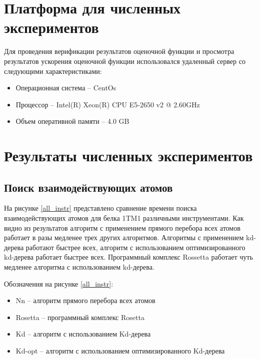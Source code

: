 \section{Платформа для численных экспериментов}


Для проведения верификации результатов оценочной функции и просмотра результатов ускорения оценочной функции использовался удаленный сервер со следующими характеристиками: 

\begin{itemize}
	\item Операционная система -- CentOs
	\item Процессор -- Intel(R) Xeon(R) CPU E5-2650 v2 @ 2.60GHz
	\item Объем оперативной памяти -- 4.0 GB
\end{itemize}


\section{Результаты численных экспериментов}

\subsection{Поиск взаимодействующих атомов}


На рисунке \ref{all_instr} представлено сравнение времени поиска взаимодействующих атомов для белка 1TM1 различными инструментами. Как видно из результатов алгоритм с применением прямого перебора всех атомов работает в разы медленее трех других алгоритмов. Алгоритмы с применением kd-дерева работают быстрее всех, алгоритм с использованием оптимизированного kd-дерева работает быстрее всех. Программный комплекс Rossetta работает чуть медленее алгоритма с использованием kd-дерева.

Обозначения на рисунке \ref{all_instr}:
\begin{itemize}
	\item Nn -- алгоритм прямого перебора всех атомов
	\item Rosetta -- программный комплекс Rosetta
	\item Kd -- алгоритм с использованием Kd-дерева
	\item Kd-opt -- алгоритм с использованием оптимизированного Kd-дерева
\end{itemize}

